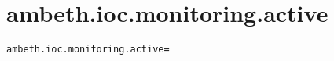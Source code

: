 \section{ambeth.ioc.monitoring.active}
\label{configuration:AmbethIocMonitoringActive}
\AvailableInCsharpOnly{\TODO}
\begin{lstlisting}[style=Props,caption={Usage example for \textit{ambeth.ioc.monitoring.active}}]
ambeth.ioc.monitoring.active=
\end{lstlisting}